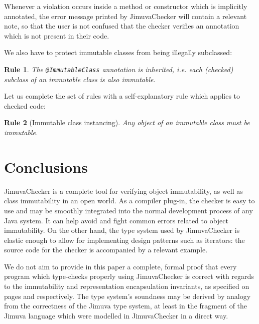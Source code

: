 \documentclass{pracamgr}
\theoremstyle{break}
\theoremstyle{break}
\theoremstyle{break}
\newtheorem{verrule}{Rule}
\begin{document}
Whenever a violation occurs inside a method or constructor which is
implicitly annotated, the error message printed by JimuvaChecker will
contain a relevant note, so that the user is not confused that the
checker verifies an annotation which is not present in their code.

We also have to protect immutable classes from being illegally
subclassed: 
\begin{verrule}
  The \texttt{@ImmutableClass} annotation is inherited, i.e. each
  (checked) subclass of an immutable class is also immutable. 
\end{verrule}

Let us complete the set of rules with a self-explanatory rule which
applies to checked code:
\begin{verrule}[Immutable class instancing]
  Any object of an immutable class must be immutable. 
\end{verrule}

\section{Conclusions}

JimuvaChecker is a complete tool for verifying object immutability, as
well as class immutability in an open world. As a compiler plug-in,
the checker is easy to use and may be smoothly integrated into the
normal development process of any Java system. It can help avoid and
fight common errors related to object immutability. On the other hand,
the type system used by JimuvaChecker is elastic enough to allow for
implementing design patterns such as iterators: the source code for
the checker is accompanied by a relevant example. 

We do not aim to provide in this paper a complete, formal proof that
every program which type-checks properly using JimuvaChecker is
correct with regards to the immutability and representation
encapsulation invariants, as specified on pages \pageref{inv:open} and
\pageref{inv:encap} respectively. The type system's soundness may be
derived by analogy from the correctness of the Jimuva type system, at
least in the fragment of the Jimuva language which were modelled in
JimuvaChecker in a direct way.
\end{document}
